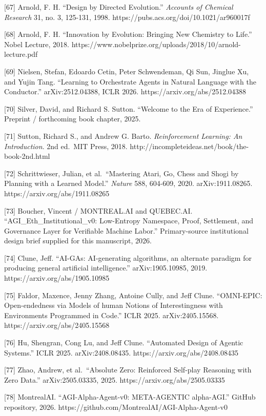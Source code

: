 {[}67{]} Arnold, F. H. ``Design by Directed Evolution.'' \emph{Accounts
of Chemical Research} 31, no. 3, 125-131, 1998.
https://pubs.acs.org/doi/10.1021/ar960017f

{[}68{]} Arnold, F. H. ``Innovation by Evolution: Bringing New Chemistry
to Life.'' Nobel Lecture, 2018.
https://www.nobelprize.org/uploads/2018/10/arnold-lecture.pdf

{[}69{]} Nielsen, Stefan, Edoardo Cetin, Peter Schwendeman, Qi Sun,
Jinglue Xu, and Yujin Tang. ``Learning to Orchestrate Agents in Natural
Language with the Conductor.'' arXiv:2512.04388, ICLR 2026.
https://arxiv.org/abs/2512.04388

{[}70{]} Silver, David, and Richard S. Sutton. ``Welcome to the Era of
Experience.'' Preprint / forthcoming book chapter, 2025.

{[}71{]} Sutton, Richard S., and Andrew G. Barto. \emph{Reinforcement
Learning: An Introduction}. 2nd ed.~MIT Press, 2018.
http://incompleteideas.net/book/the-book-2nd.html

{[}72{]} Schrittwieser, Julian, et al.~``Mastering Atari, Go, Chess and
Shogi by Planning with a Learned Model.'' \emph{Nature} 588, 604-609,
2020. arXiv:1911.08265. https://arxiv.org/abs/1911.08265

{[}73{]} Boucher, Vincent / MONTREAL.AI and QUEBEC.AI.
``AGI\_Eth\_Institutional\_v0: Low-Entropy Namespace, Proof, Settlement,
and Governance Layer for Verifiable Machine Labor.'' Primary-source
institutional design brief supplied for this manuscript, 2026.

{[}74{]} Clune, Jeff. ``AI-GAs: AI-generating algorithms, an alternate
paradigm for producing general artificial intelligence.''
arXiv:1905.10985, 2019. https://arxiv.org/abs/1905.10985

{[}75{]} Faldor, Maxence, Jenny Zhang, Antoine Cully, and Jeff Clune.
``OMNI-EPIC: Open-endedness via Models of human Notions of
Interestingness with Environments Programmed in Code.'' ICLR 2025.
arXiv:2405.15568. https://arxiv.org/abs/2405.15568

{[}76{]} Hu, Shengran, Cong Lu, and Jeff Clune. ``Automated Design of
Agentic Systems.'' ICLR 2025. arXiv:2408.08435.
https://arxiv.org/abs/2408.08435

{[}77{]} Zhao, Andrew, et al.~``Absolute Zero: Reinforced Self-play
Reasoning with Zero Data.'' arXiv:2505.03335, 2025.
https://arxiv.org/abs/2505.03335

{[}78{]} MontrealAI. ``AGI-Alpha-Agent-v0: META-AGENTIC alpha-AGI.''
GitHub repository, 2026.
https://github.com/MontrealAI/AGI-Alpha-Agent-v0

